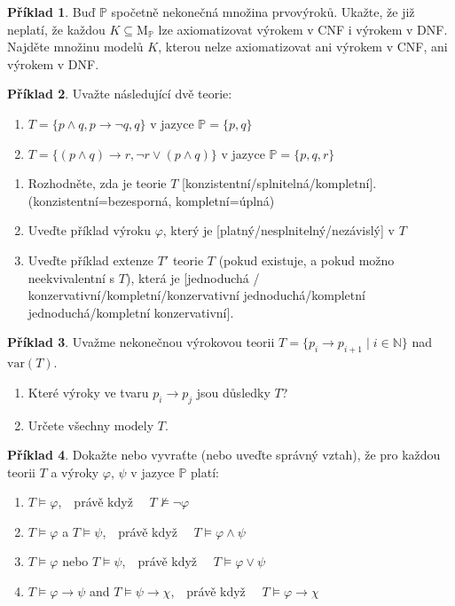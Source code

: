 \documentclass[a4paper]{article}
\theoremstyle{definition}
\newtheorem{problem}{Příklad}
\begin{document}
    
\medskip\begin{problem} Buď $\mathbb P$ spočetně nekonečná množina prvovýroků. Ukažte, že již neplatí, že každou $K\subseteq \mathrm{M}_\mathbb P$ lze axiomatizovat výrokem v CNF i výrokem v DNF. Najděte množinu modelů $K$, kterou nelze axiomatizovat ani výrokem v CNF, ani výrokem v DNF.
\end{problem}


\medskip\begin{problem}
Uvažte následující dvě teorie:
\begin{enumerate}[label=(\Roman*)]
    \item $T=\{p\wedge q,p\to\neg q,q\}$ v jazyce $\mathbb P=\{p,q\}$
    \item $T=\{(p\wedge q)\to r, \neg r\vee(p\wedge q)\}$ v jazyce $\mathbb P=\{p,q,r\}$        
\end{enumerate}
\begin{enumerate}
    \item Rozhodněte, zda je teorie $T$ [konzistentní/splnitelná/kompletní]. (konzistentní=bezesporná, kompletní=úplná)
    \item Uveďte příklad výroku $\varphi$, který je [platný/nesplnitelný/nezávislý] v $T$
    \item Uveďte příklad extenze $T'$ teorie $T$ (pokud existuje, a pokud možno neekvivalentní s $T$), která je [jednoduchá / konzervativní/kompletní/konzervativní jednoduchá/kompletní jednoduchá/kompletní konzervativní].
\end{enumerate}

\end{problem}
        
    
\medskip\begin{problem}
Uvažme nekonečnou výrokovou teorii $T=\{p_i \to p_{i+1}\mid i\in \mathbb{N}\}$ nad $\mathrm{var}(T)$. 
\begin{enumerate}
    \item Které výroky ve tvaru  $p_i \to p_j$ jsou důsledky $T$?
    \item Určete všechny modely $T$.
\end{enumerate}
\end{problem}


\medskip\begin{problem}
Dokažte nebo vyvraťte (nebo uveďte správný vztah), že pro každou teorii $T$ a výroky $\varphi$, $\psi$ v jazyce $\mathbb{P}$ platí:
\begin{enumerate}
    \item $T \models \varphi$,\ \  právě když \ \ $T \not\models \neg \varphi$
    \item $T \models \varphi$ a $T \models \psi$,\ \ právě když \ \ $T \models \varphi \wedge \psi$
    \item $T \models \varphi$ nebo $T \models \psi$,\ \ právě když \ \ $T \models \varphi \vee \psi$
    \item $T \models \varphi \to \psi$ and $T \models \psi \to \chi$,\ \ právě když \ \ $T \models \varphi \to \chi$
\end{enumerate}
\end{problem}
    
\end{document}
